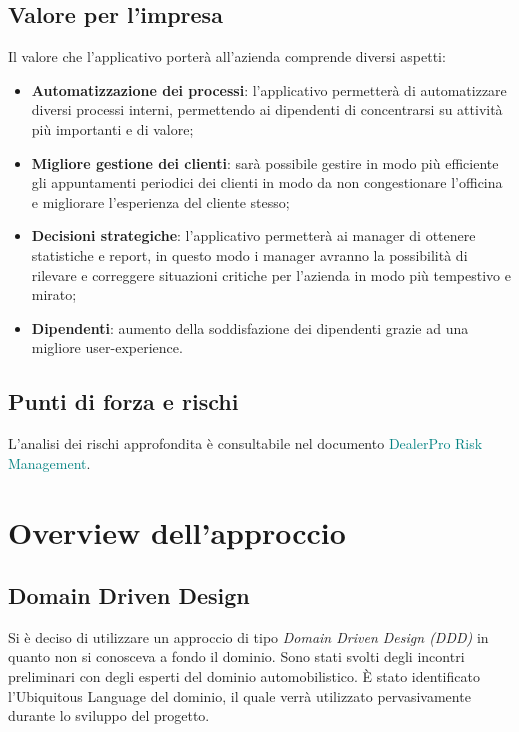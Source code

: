 \documentclass{article}
\begin{document}
  \subsection{Valore per l'impresa}

  Il valore che l'applicativo porterà all'azienda comprende diversi aspetti:
  \begin{itemize}
    \item \textbf{Automatizzazione dei processi}: l'applicativo permetterà di automatizzare 
      diversi processi interni, permettendo ai dipendenti di concentrarsi su attività più 
      importanti e di valore;
    \item \textbf{Migliore gestione dei clienti}: sarà possibile gestire in modo più efficiente gli appuntamenti
      periodici dei clienti in modo da non congestionare l'officina e migliorare l'esperienza del cliente stesso;
    \item \textbf{Decisioni strategiche}: l'applicativo permetterà ai manager di ottenere statistiche e report, in questo
      modo i manager avranno la possibilità di rilevare e correggere situazioni critiche per l'azienda in modo più tempestivo
      e mirato;
    \item \textbf{Dipendenti}: aumento della soddisfazione dei dipendenti grazie ad una migliore user-experience.
  \end{itemize}


  \subsection{Punti di forza e rischi}
  L'analisi dei rischi approfondita è consultabile nel documento \textcolor{teal}{DealerPro Risk Management}.

  \newpage
  \section{Overview dell'approccio}

  \subsection{Domain Driven Design}

  Si è deciso di utilizzare un approccio di tipo \emph{Domain Driven Design (DDD)} in quanto non si conosceva 
  a fondo il dominio. Sono stati svolti degli incontri preliminari con degli esperti del 
  dominio automobilistico. È stato identificato l’Ubiquitous Language del dominio, il quale verrà utilizzato 
  pervasivamente durante lo sviluppo del progetto. 
\end{document}
